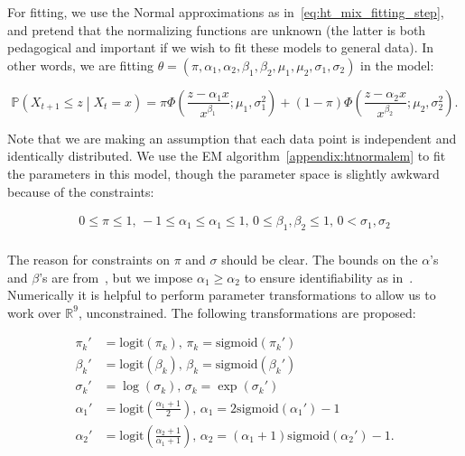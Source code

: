 \documentclass[11pt,twoside,openany]{book}
\newcommand{\prob}{\mathbb{P}}
\newcommand{\reals}{\mathbb{R}}
\numberwithin{Theorem}{chapter}
\numberwithin{Definition}{chapter}
\numberwithin{Lemma}{chapter}
\numberwithin{Algorithm}{chapter}
\numberwithin{equation}{chapter}
\begin{document}
For fitting, we use the Normal approximations as
in~\eqref{eq:ht_mix_fitting_step}, and pretend that the normalizing
functions are unknown (the latter is both pedagogical and important if we wish
to fit these models to general data). In other words, we are fitting
$\theta=(\pi,\alpha_1,\alpha_2,\beta_1,\beta_2,\mu_1,\mu_2,\sigma_1,\sigma_2)$
in the model:

\[
  \prob\left(X_{t+1}\leq z\middle| X_{t} = x\right)
  =  \pi \Phi\left(\frac{z - \alpha_1 x}{x^{\beta_1}};\mu_1,\sigma_1^2\right)
  +  (1-\pi) \Phi\left(\frac{z - \alpha_2 x}{x^{\beta_2}};\mu_2,\sigma_2^2\right).
\]

Note that we are making an assumption that each data point is independent and identically distributed.
We use the EM algorithm~\ref{appendix:htnormalem} to fit the parameters in this model, though the parameter space is slightly awkward because of the constraints:

\begin{equation}\label{eq:constraints_k_2}
  \begin{split}
  0 \leq \pi \leq 1,\, -1 \leq \alpha_1\leq\alpha_1 \leq 1,\,
  0 \leq \beta_1,\beta_2 \leq 1,\, 0 < \sigma_1,\sigma_2\\
  \end{split}
\end{equation}

The reason for constraints on $\pi$ and $\sigma$ should be clear.
The bounds on the $\alpha$'s and $\beta$'s are from~\cite{keef2013estimation},
but we impose $\alpha_1\geq\alpha_2$ to ensure identifiability as in~\cite{tendijck2021modeling}.
Numerically it is helpful to perform parameter transformations to allow
us to work over $\reals^9$, unconstrained. The following transformations
are proposed:

\begin{equation}\label{eq:htconstr}
  \begin{split}
  \pi_k' &= \text{logit}(\pi_k),\,\pi_k = \text{sigmoid}(\pi_k')\\
  \beta_k' &= \text{logit}(\beta_k),\,\beta_k = \text{sigmoid}(\beta_k')\\
  \sigma_k' &= \log(\sigma_k),\,\sigma_k = \exp(\sigma_k')\\
  \alpha_1' &= \text{logit}\left(\frac{\alpha_1 + 1}{2}\right),\,\alpha_1 = 2\text{sigmoid}(\alpha_1') - 1\\
  \alpha_2' &= \text{logit}\left(\frac{\alpha_2 + 1}{\alpha_1 + 1}\right),\,
  \alpha_2 = (\alpha_1 + 1)\text{sigmoid}(\alpha_2') - 1.\\
\end{split}
\end{equation}
\end{document}
